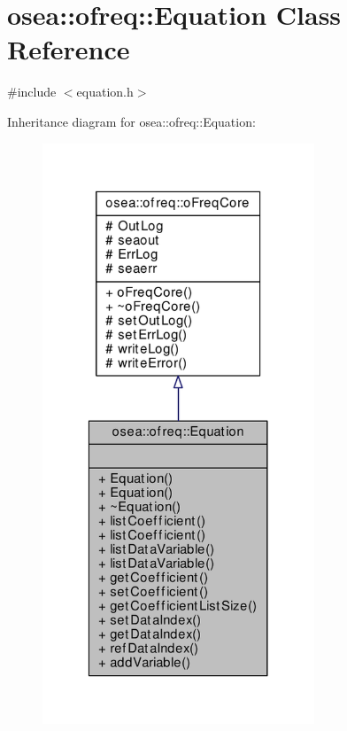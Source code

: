 \hypertarget{classosea_1_1ofreq_1_1_equation}{\section{osea\-:\-:ofreq\-:\-:Equation Class Reference}
\label{classosea_1_1ofreq_1_1_equation}
}


{\ttfamily \#include $<$equation.\-h$>$}



Inheritance diagram for osea\-:\-:ofreq\-:\-:Equation\-:\nopagebreak
\begin{figure}[H]
\begin{center}
\leavevmode
\includegraphics[width=230pt]{classosea_1_1ofreq_1_1_equation__inherit__graph}
\end{center}
\end{figure}
